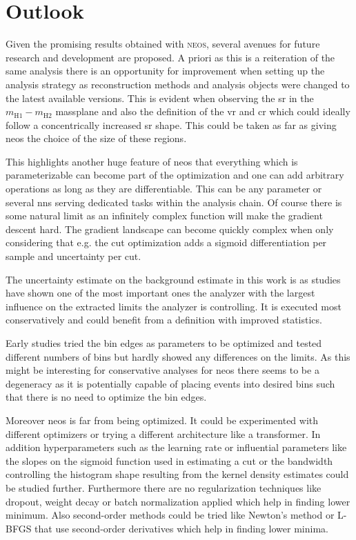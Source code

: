 \section{Outlook}
Given the promising results obtained with \textsc{neos}, several avenues for future research and development are proposed. A priori as this is a reiteration of the same analysis there is an opportunity for improvement when setting up the analysis strategy as reconstruction methods and analysis objects were changed to the latest available versions. This is evident when observing the \ac{sr} in the $m_\text{H1}-m_\text{H2}$ massplane and also the definition of the \ac{vr} and \ac{cr} which could ideally follow a concentrically increased \ac{sr} shape. This could be taken as far as giving \ac{neos} the choice of the size of these regions.

This highlights another huge feature of \ac{neos} that everything which is parameterizable can become part of the optimization and one can add arbitrary operations as long as they are differentiable. This can be any parameter or several \acp{nn} serving dedicated tasks within the analysis chain. Of course there is some natural limit as an infinitely complex function will make the gradient descent hard. The gradient landscape can become quickly complex when only considering that e.g. the cut optimization adds a sigmoid differentiation per sample and uncertainty per cut.

The uncertainty estimate on the background estimate in this work is as studies have shown one of the most important ones the analyzer with the largest influence on the extracted limits the analyzer is controlling. It is executed most conservatively and could benefit from a definition with improved statistics.

Early studies tried the bin edges as parameters to be optimized and tested different numbers of bins but hardly showed any differences on the limits. As this might be interesting for conservative analyses for \ac{neos} there seems to be a degeneracy as it is potentially capable of placing events into desired bins such that there is no need to optimize the bin edges.

Moreover \ac{neos} is far from being optimized. It could be experimented with different optimizers or trying a different architecture like a transformer. In addition hyperparameters such as the learning rate or influential parameters like the slopes on the sigmoid function used in estimating a cut or the bandwidth controlling the histogram shape resulting from the kernel density estimates could be studied further. Furthermore there are no regularization techniques like dropout, weight decay or batch normalization applied which help in finding lower minimum. Also second-order methods could be tried like Newton's method or L-BFGS that use second-order derivatives which help in finding lower minima.

